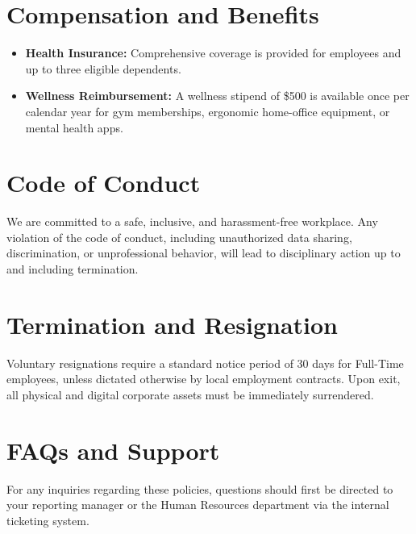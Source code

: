 \documentclass[11pt, a4paper]{article}
\begin{document}
\section{Compensation and Benefits}
\begin{itemize}[label=\textcolor{primary}{\textbullet}]
    \item \textbf{Health Insurance:} Comprehensive coverage is provided for employees and up to three eligible dependents.
    \item \textbf{Wellness Reimbursement:} A wellness stipend of \$500 is available once per calendar year for gym memberships, ergonomic home-office equipment, or mental health apps.
\end{itemize}

\section{Code of Conduct}
We are committed to a safe, inclusive, and harassment-free workplace. Any violation of the code of conduct, including unauthorized data sharing, discrimination, or unprofessional behavior, will lead to disciplinary action up to and including termination.

\section{Termination and Resignation}
Voluntary resignations require a standard notice period of 30 days for Full-Time employees, unless dictated otherwise by local employment contracts. Upon exit, all physical and digital corporate assets must be immediately surrendered.

\section{FAQs and Support}
For any inquiries regarding these policies, questions should first be directed to your reporting manager or the Human Resources department via the internal ticketing system.
\end{document}
